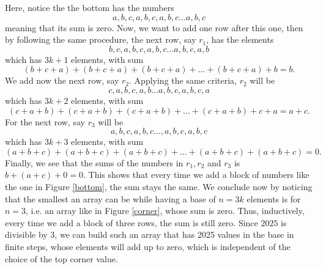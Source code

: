 \documentclass[a4paper,12pt]{article}
\begin{document}
\newpage

Here, notice the the bottom has the numbers
$$a,b,c,a,b,c,a,b,c\ldots a,b,c$$
meaning that its sum is zero. Now, we want to add one row after this one, then by following the same procedure, the next row, say $r_1$, has the elements
$$b,c,a,b,c,a,b,c\ldots a,b,c,a,b$$
which has $3k+1$ elements, with sum
$$(b+c+a)+(b+c+a)+(b+c+a)+\ldots+(b+c+a)+b=b.$$
We add now the next row, say $r_2$. Applying the same criteria, $r_2$ will be 
$$c,a,b,c,a,b\ldots a,b,c,a,b,c,a$$
which has $3k+2$ elements, with sum
$$(c+a+b)+(c+a+b)+(c+a+b)+\ldots+(c+a+b)+c+a=a+c.$$
For the next row, say $r_3$ will be
$$a,b,c,a,b,c\ldots,a,b,c,a,b,c$$
which has $3k+3$ elements, with sum
$$(a+b+c)+(a+b+c)+(a+b+c)+\ldots+(a+b+c)+(a+b+c)=0.$$
Finally, we see that the sums of the numbers in $r_1,r_2$ and $r_3$ is $b+(a+c)+0=0$. This shows that every time we add a block of numbers like the one in Figure \ref{bottom}, the sum stays the same. We conclude now by noticing that the smallest an array can be while having a base of $n=3k$ elements is for $n=3$, i.e. an array like in Figure \ref{corner}, whose sum is zero. Thus, inductively, every time we add a block of three rows, the sum is still zero. Since $2025$ is divisible by 3, we can build such an array that has 2025 values in the base in finite steps, whose elements will add up to zero, which is independent of the choice of the top corner value.
\endgroup
\end{document}

